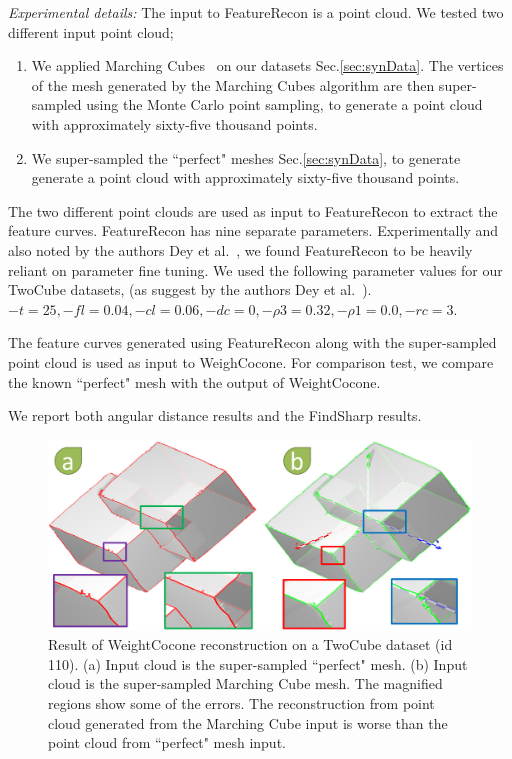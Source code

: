 \textit{Experimental details:} The input to FeatureRecon is a point cloud. We tested two different input point cloud;
\begin{enumerate}
	\item We applied Marching Cubes~\cite{lc-mchr3-87} on our datasets Sec.\ref{sec:synData}. The vertices of the mesh generated by the Marching Cubes algorithm are then super-sampled using the Monte Carlo point sampling, to generate a point cloud with approximately sixty-five thousand points.
	\item We super-sampled the ``perfect" meshes Sec.\ref{sec:synData}, to generate generate a point cloud with approximately sixty-five thousand points.
\end{enumerate}
The two different point clouds are used as input to FeatureRecon to extract the feature curves. 
FeatureRecon has nine separate parameters. Experimentally and also noted by the authors Dey et al.~\cite{Dey2013}, we found FeatureRecon to be heavily reliant on parameter fine tuning. We used the following parameter values for our TwoCube datasets, (as suggest by the authors Dey et al.~\cite{Dey2013}). 
$-t = 25,-fl = 0.04, -cl = 0.06, -dc = 0, -\rho3 = 0.32, -\rho1 = 0.0, -rc = 3$.

The feature curves generated using FeatureRecon along with the super-sampled point cloud is used as input to WeighCocone. For comparison test, we compare the known ``perfect" mesh with the output of WeightCocone. 

We report both angular distance results and the FindSharp results.
\begin{figure}[t] 
	\centering  	
	\includegraphics[width=\linewidth]{images/compare_cocone_perfect_mc.eps}
	\caption{Result of WeightCocone reconstruction on a TwoCube dataset (id 110). (a) Input cloud is the super-sampled ``perfect" mesh. (b) Input cloud is the super-sampled Marching Cube mesh. The magnified regions show some of the errors. The reconstruction from point cloud generated from the Marching Cube input is worse than the  point cloud from ``perfect" mesh input. }
	\label{fig:cocone_compare_from_perfect_1}
	\vskip-0.2cm
\end{figure} 



